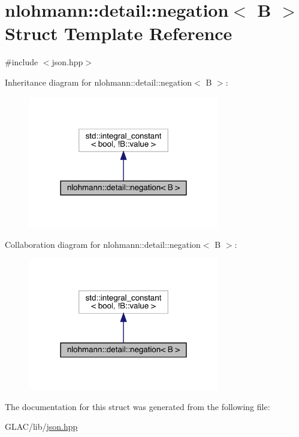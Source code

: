 \hypertarget{structnlohmann_1_1detail_1_1negation}{}\section{nlohmann\+::detail\+::negation$<$ B $>$ Struct Template Reference}
\label{structnlohmann_1_1detail_1_1negation}


{\ttfamily \#include $<$json.\+hpp$>$}



Inheritance diagram for nlohmann\+::detail\+::negation$<$ B $>$\+:
\nopagebreak
\begin{figure}[H]
\begin{center}
\leavevmode
\includegraphics[width=237pt]{structnlohmann_1_1detail_1_1negation__inherit__graph}
\end{center}
\end{figure}


Collaboration diagram for nlohmann\+::detail\+::negation$<$ B $>$\+:
\nopagebreak
\begin{figure}[H]
\begin{center}
\leavevmode
\includegraphics[width=237pt]{structnlohmann_1_1detail_1_1negation__coll__graph}
\end{center}
\end{figure}


The documentation for this struct was generated from the following file\+:\begin{DoxyCompactItemize}
\item 
G\+L\+A\+C/lib/\mbox{\hyperlink{json_8hpp}{json.\+hpp}}\end{DoxyCompactItemize}
